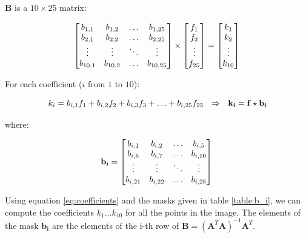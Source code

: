 \documentclass{ipol}
\numberwithin{equation}{section}
\numberwithin{table}{section}
\numberwithin{figure}{section}
\begin{document}
$\mathbf{B}$ is a $10\times25$ matrix: 

\begin{equation*}
	\begin{bmatrix}
		b_{1,1}		& b_{1,2}	& \hdots	& b_{1,25}	\\
		b_{2,1}		& b_{2,2}	& \hdots	& b_{2,25}	\\
		\vdots		& \vdots	& \ddots	& \vdots	\\
		b_{10,1}	& b_{10,2}	& \hdots	& b_{10,25}
	\end{bmatrix}
	\times
	\begin{bmatrix}
		f_1		\\
		f_2		\\
		\vdots	\\
		f_{25}
	\end{bmatrix}
	=
	\begin{bmatrix}
		k_1		\\
		k_2		\\
		\vdots	\\
		k_{10}
	\end{bmatrix}\\
\end{equation*}

For each coefficient ($i$ from $1$ to $10$):

\begin{equation}
	\label{eq:coefficients}
	k_i = b_{i,1}f_1 + b_{i,2}f_2 + b_{i,3}f_3 + \hdots + b_{i,25}f_{25} \ \ \Rightarrow \ \ \mathbf{k_i} = \mathbf{f}\star\mathbf{b_i}\\
\end{equation}

where:

\begin{equation}
	\label{eq:b_i}
	\mathbf{b_i} = \begin{bmatrix}	b_{i,1}		& b_{i,2}	& \hdots	& b_{i,5}	\\
									b_{i,6}		& b_{i,7}	& \hdots	& b_{i,10}	\\
									\vdots		& \vdots	& \ddots	& \vdots	\\
									b_{i,21}	& b_{i,22}	& \hdots	& b_{i,25}	\\
					\end{bmatrix}\\
\end{equation}

Using equation \ref{eq:coefficients} and the masks given in table \ref{table:b_i}, we can compute 
the coefficients $k_1 \hdots k_{10}$ for all the points in the image. The elements of the mask $\mathbf{b_i}$ 
are the elements of the i-th row of $\mathbf{B} = (\mathbf{A}^T\mathbf{A})^{-1}\mathbf{A}^T$.\\
\end{document}
